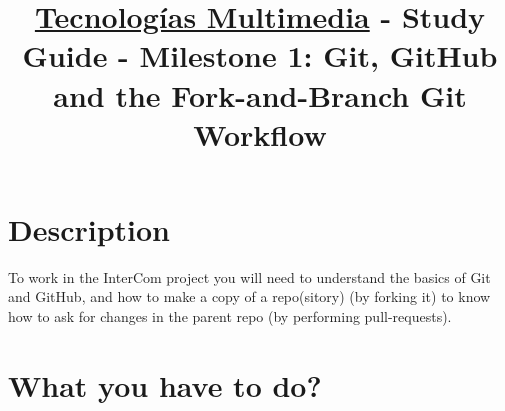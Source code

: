 \title{\href{https://www.ual.es/estudios/grados/presentacion/plandeestudios/asignatura/4015/40154321?idioma=zh_CN}{Tecnologías Multimedia} - Study Guide - Milestone 1: Git, GitHub and the Fork-and-Branch Git Workflow}

\maketitle

\section{Description}

To work in the InterCom project \cite{intercom} you will need to
understand the basics of Git and GitHub, and how to make a copy of a
repo(sitory) (by forking it) to know how to ask for changes in the
parent repo (by performing pull-requests).

\section{What you have to do?}

